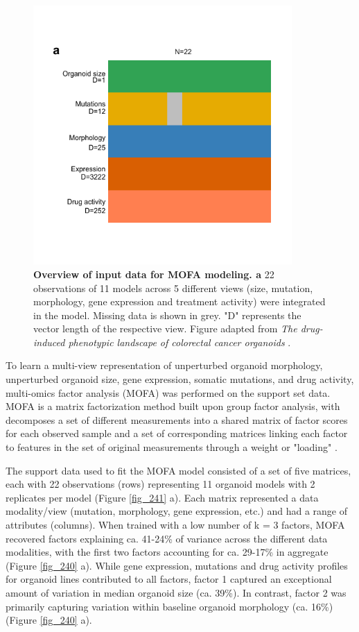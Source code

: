 \begin{flushleft}
\begin{figure}[!h]
\centering
\includegraphics[width=280pt,
                height=\textheight,
                keepaspectratio]{figures/promise/pdf/fig_4_2.pdf}
\caption[Overview of input data for MOFA modeling]{\textbf{Overview of input data for MOFA modeling. a} 22 observations of 11 models across 5 different views (size, mutation, morphology, gene expression and treatment activity) were integrated in the model. Missing data is shown in grey. "D" represents the vector length of the respective view. Figure adapted from \textit{The drug-induced phenotypic landscape of colorectal cancer organoids} \citep{betgeDruginducedPhenotypicLandscape2022}.}
\label{fig_242}
\end{figure}

To learn a multi-view representation of unperturbed organoid morphology, unperturbed organoid size, gene expression, somatic mutations, and drug activity, multi-omics factor analysis (MOFA) was performed on the support set data. MOFA is a matrix factorization method built upon group factor analysis, with decomposes a set of different measurements into a shared matrix of factor scores for each observed sample and a set of corresponding matrices linking each factor to features in the set of original measurements through a weight or "loading" \citep{argelaguetMultiOmicsFactorAnalysis2018b}. 

\bigbreak
The support data used to fit the MOFA model consisted of a set of five matrices, each with 22 observations (rows) representing 11 organoid models with 2 replicates per model (Figure \ref{fig_241} a). Each matrix represented a data modality/view (mutation, morphology, gene expression, etc.) and had a range of attributes (columns). When trained with a low number of k = 3 factors, MOFA recovered factors explaining ca. 41-24\% of variance across the different data modalities, with the first two factors accounting for ca. 29-17\% in aggregate (Figure \ref{fig_240} a). While gene expression, mutations and drug activity profiles for organoid lines contributed to all factors, factor 1 captured an exceptional amount of variation in median organoid size (ca. 39\%). In contrast, factor 2 was primarily capturing variation within baseline organoid morphology (ca. 16\%) (Figure \ref{fig_240} a).


\end{flushleft}
